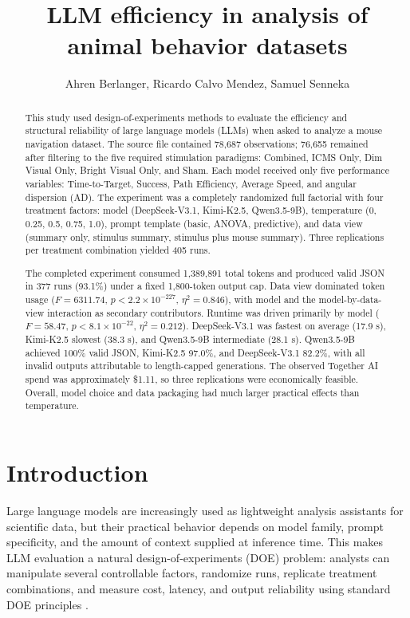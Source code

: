 \documentclass{article}
\title{LLM efficiency in analysis of animal behavior datasets}
\author{Ahren Berlanger, Ricardo Calvo Mendez, Samuel Senneka}
\begin{document}
\maketitle

\begin{abstract}
This study used design-of-experiments methods to evaluate the efficiency and structural reliability of large language models (LLMs) when asked to analyze a mouse navigation dataset. The source file contained 78{,}687 observations; 76{,}655 remained after filtering to the five required stimulation paradigms: Combined, ICMS Only, Dim Visual Only, Bright Visual Only, and Sham. Each model received only five performance variables: Time-to-Target, Success, Path Efficiency, Average Speed, and angular dispersion (AD). The experiment was a completely randomized full factorial with four treatment factors: model (DeepSeek-V3.1, Kimi-K2.5, Qwen3.5-9B), temperature (0, 0.25, 0.5, 0.75, 1.0), prompt template (basic, ANOVA, predictive), and data view (summary only, stimulus summary, stimulus plus mouse summary). Three replications per treatment combination yielded 405 runs.

The completed experiment consumed 1{,}389{,}891 total tokens and produced valid JSON in 377 runs (93.1\%) under a fixed 1{,}800-token output cap. Data view dominated token usage ($F=6311.74$, $p<2.2\times10^{-227}$, $\eta^2=0.846$), with model and the model-by-data-view interaction as secondary contributors. Runtime was driven primarily by model ($F=58.47$, $p<8.1\times10^{-22}$, $\eta^2=0.212$). DeepSeek-V3.1 was fastest on average (17.9 s), Kimi-K2.5 slowest (38.3 s), and Qwen3.5-9B intermediate (28.1 s). Qwen3.5-9B achieved 100\% valid JSON, Kimi-K2.5 97.0\%, and DeepSeek-V3.1 82.2\%, with all invalid outputs attributable to length-capped generations. The observed Together AI spend was approximately \$1.11, so three replications were economically feasible. Overall, model choice and data packaging had much larger practical effects than temperature.
\end{abstract}

\section{Introduction}

Large language models are increasingly used as lightweight analysis assistants for scientific data, but their practical behavior depends on model family, prompt specificity, and the amount of context supplied at inference time. This makes LLM evaluation a natural design-of-experiments (DOE) problem: analysts can manipulate several controllable factors, randomize runs, replicate treatment combinations, and measure cost, latency, and output reliability using standard DOE principles \cite{montgomery,boxhunter}.
\end{document}
